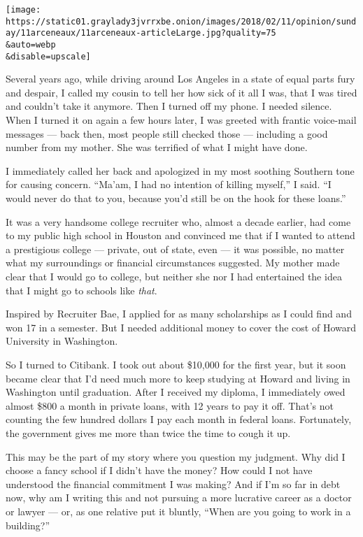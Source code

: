 \texttt{[image: https://static01.graylady3jvrrxbe.onion/images/2018/02/11/opinion/sunday/11arceneaux/11arceneaux-articleLarge.jpg?quality=75\\\&auto=webp\\\&disable=upscale]}

Several years ago, while driving around Los Angeles in a state of equal
parts fury and despair, I called my cousin to tell her how sick of it
all I was, that I was tired and couldn't take it anymore. Then I turned
off my phone. I needed silence. When I turned it on again a few hours
later, I was greeted with frantic voice-mail messages --- back then,
most people still checked those --- including a good number from my
mother. She was terrified of what I might have done.

I immediately called her back and apologized in my most soothing
Southern tone for causing concern. ``Ma'am, I had no intention of
killing myself,'' I said. ``I would never do that to you, because you'd
still be on the hook for these loans.''

It was a very handsome college recruiter who, almost a decade earlier,
had come to my public high school in Houston and convinced me that if I
wanted to attend a prestigious college --- private, out of state, even
--- it was possible, no matter what my surroundings or financial
circumstances suggested. My mother made clear that I would go to
college, but neither she nor I had entertained the idea that I might go
to schools like \emph{that}.

Inspired by Recruiter Bae, I applied for as many scholarships as I could
find and won 17 in a semester. But I needed additional money to cover
the cost of Howard University in Washington.

So I turned to Citibank. I took out about \$10,000 for the first year,
but it soon became clear that I'd need much more to keep studying at
Howard and living in Washington until graduation. After I received my
diploma, I immediately owed almost \$800 a month in private loans, with
12 years to pay it off. That's not counting the few hundred dollars I
pay each month in federal loans. Fortunately, the government gives me
more than twice the time to cough it up.

This may be the part of my story where you question my judgment. Why did
I choose a fancy school if I didn't have the money? How could I not have
understood the financial commitment I was making? And if I'm so far in
debt now, why am I writing this and not pursuing a more lucrative career
as a doctor or lawyer --- or, as one relative put it bluntly, ``When are
you going to work in a building?''

